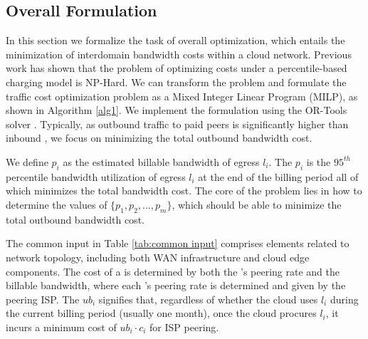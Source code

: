 \subsection{Overall Formulation}    \label{sec:overall-opt}
{In this section we formalize the task of overall optimization, which entails the minimization of interdomain bandwidth costs within a cloud network. Previous work \cite{goldenberg2004optimizing} has shown that the problem of optimizing costs under a percentile-based charging model is NP-Hard. We can transform the problem and formulate the traffic cost optimization problem as a Mixed Integer Linear Program (MILP), as shown in Algorithm \ref{alg1}. We implement the formulation using the OR-Tools solver \cite{or-tools}. Typically, as outbound traffic to paid peers is significantly higher than inbound \cite{singh2021costCascara}, we focus on minimizing the total outbound bandwidth cost.}

We define $p_i$ as the estimated billable bandwidth of egress $l_i$. The $p_i$ is the $95^{th}$ percentile bandwidth utilization of egress $l_i$ at the end of the billing period all of which minimizes the total bandwidth cost.
The core of the problem lies in how to determine the values of $\{p_1, p_2,..., p_{m}\}$, which should be able to minimize the total outbound bandwidth cost.


The common input in Table \ref{tab:common input} comprises elements related to network topology, including both WAN infrastructure and cloud edge components. The cost of a {\egress} is determined by both the {\egress}'s peering rate and the billable bandwidth, where each {\egress}'s peering rate is determined and given by the peering ISP. The $ub_i$ signifies that, regardless of whether the cloud uses {\egress} $l_i$ during the current billing period (usually one month), once the cloud procures {\egress} $l_i$, it incurs a minimum cost of $ub_i \cdot c_i$ for ISP peering. 

